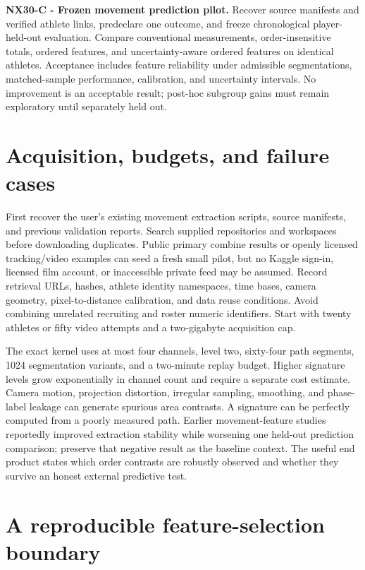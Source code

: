 \documentclass[
  11pt,
  a4paper,
]{report}
\begin{document}
\textbf{NX30-C - Frozen movement prediction pilot.} Recover source
manifests and verified athlete links, predeclare one outcome, and freeze
chronological player-held-out evaluation. Compare conventional
measurements, order-insensitive totals, ordered features, and
uncertainty-aware ordered features on identical athletes. Acceptance
includes feature reliability under admissible segmentations,
matched-sample performance, calibration, and uncertainty intervals. No
improvement is an acceptable result; post-hoc subgroup gains must remain
exploratory until separately held out.

\hypertarget{acquisition-budgets-and-failure-cases}{%
\section{Acquisition, budgets, and failure
cases}\label{acquisition-budgets-and-failure-cases}}

First recover the user's existing movement extraction scripts, source
manifests, and previous validation reports. Search supplied repositories
and workspaces before downloading duplicates. Public primary combine
results or openly licensed tracking/video examples can seed a fresh
small pilot, but no Kaggle sign-in, licensed film account, or
inaccessible private feed may be assumed. Record retrieval URLs, hashes,
athlete identity namespaces, time bases, camera geometry,
pixel-to-distance calibration, and data reuse conditions. Avoid
combining unrelated recruiting and roster numeric identifiers. Start
with twenty athletes or fifty video attempts and a two-gigabyte
acquisition cap.

The exact kernel uses at most four channels, level two, sixty-four path
segments, 1024 segmentation variants, and a two-minute replay budget.
Higher signature levels grow exponentially in channel count and require
a separate cost estimate. Camera motion, projection distortion,
irregular sampling, smoothing, and phase-label leakage can generate
spurious area contrasts. A signature can be perfectly computed from a
poorly measured path. Earlier movement-feature studies reportedly
improved extraction stability while worsening one held-out prediction
comparison; preserve that negative result as the baseline context. The
useful end product states which order contrasts are robustly observed
and whether they survive an honest external predictive test.

\hypertarget{a-reproducible-feature-selection-boundary}{%
\section{A reproducible feature-selection
boundary}\label{a-reproducible-feature-selection-boundary}}
\end{document}
